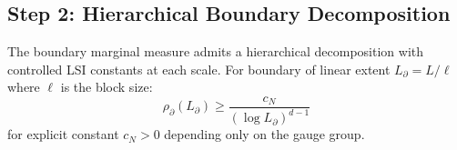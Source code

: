 \subsection{Step 2: Hierarchical Boundary Decomposition}

\begin{theorem}
\label{thm:multiscale_boundary_lsi}
The boundary marginal measure admits a hierarchical decomposition with controlled LSI constants at each scale. For boundary of linear extent $L_{\partial} = L/\ell$ where $\ell$ is the block size:
\begin{equation}
\rho_{\partial}(L_{\partial}) \geq \frac{c_N}{(\log L_{\partial})^{d-1}}
\end{equation}
for explicit constant $c_N > 0$ depending only on the gauge group.
\end{theorem}

